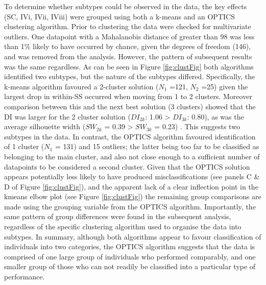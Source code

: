 \documentclass[11pt,halfline,a4paper,]{ouparticle}
\begin{document}
To determine whether subtypes could be observed in the data, the key effects (SC, IVi, IVii, IViii) were grouped using both a k-means and an OPTICS clustering algorithm. Prior to clustering the data were checked for multivariate outliers. One datapoint with a Mahalanobis distance of greater than 98 was less than 1\% likely to have occurred by chance, given the degrees of freedom (146), and was removed from the analysis. However, the pattern of subsequent results was the same regardless. As can be seen in Figure \ref{fig:clustFig} both algorithms identified two subtypes, but the nature of the subtypes differed. Specifically, the k-means algorithm favoured a 2-cluster solution (\(N_{1}\) =121, \(N_{2}\) =25) given the largest drop in within-SS occurred when moving from 1 to 2 clusters. Moreover comparison between this and the next best solution (3 clusters) showed that the DI was larger for the 2 cluster solution (\(DI_{2k}\): 1.06 \textgreater{} \(DI_{3k}\): 0.80), as was the average silhouette width (\(SW_{2k}\) = 0.39 \textgreater{} \(SW_{3k}\) = 0.23) . This suggests two subtypes in the data. In contrast, the OPTICS algorithm favoured identification of 1 cluster (\(N_{1}\) = 131) and 15 outliers; the latter being too far to be classified as belonging to the main cluster, and also not close enough to a sufficient number of datapoints to be considered a second cluster. Given that the OPTICS solution appears potentially less likely to have produced misclassifications (see panels C \& D of Figure \ref{fig:clustFig}), and the apparent lack of a clear inflection point in the kmeans elbow plot (see Figure \ref{fig:clustFig}) the remaining group comparisons are made using the grouping variable from the OPTICS algorithm. Importantly, the same pattern of group differences were found in the subsequent analysis, regardless of the specific clustering algorithm used to organise the data into subtypes. In summary, although both algorithms appear to favour classification of individuals into two categories, the OPTICS algorithm suggests that the data is comprised of one large group of individuals who performed comparably, and one smaller group of those who can not readily be classified into a particular type of performance.
\end{document}

